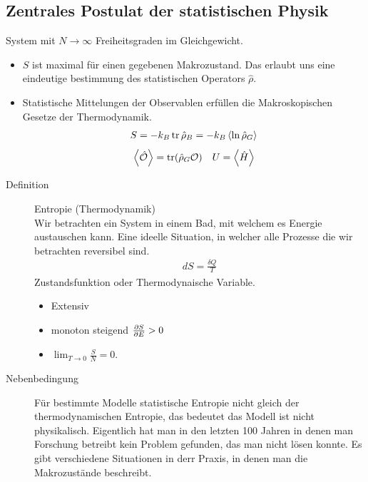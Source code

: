 \subsection*{Zentrales Postulat der statistischen Physik}
System mit $N\to \infty$ Freiheitsgraden im Gleichgewicht.
\begin{itemize}
  \item $S$ ist maximal f\"ur einen gegebenen Makrozustand. Das erlaubt uns
    eine eindeutige bestimmung des statistischen Operators $\hat{\rho}$.
  \item Statistische Mittelungen der Observablen erf\"ullen die Makroskopischen
    Gesetze der Thermodynamik.
    \begin{align*}
      S = -k_B \operatorname{tr} \hat{\rho}_B = - k_B \Braket{\ln{\hat{\rho}_G}} \\
    \end{align*}
    \begin{align*}
      \Braket{\hat{\cal{O}}}= \operatorname{tr} (\hat{\rho}_G \mathcal{O}) &&
      U = \Braket{\hat{H}}
    \end{align*}

\end{itemize}
\begin{description}
  \item[Definition] Entropie (Thermodynamik) \\
    Wir betrachten ein System in einem Bad, mit welchem es Energie austauschen
    kann. Eine ideelle Situation, in welcher alle Prozesse die wir betrachten 
    reversibel sind. 
    \begin{align*}
      dS = \frac{\delta Q}{T}
    \end{align*}
    Zustandsfunktion oder Thermodynaische Variable.
    \begin{itemize}
      \item Extensiv
      \item monoton steigend $\frac{\partial S }{\partial E} > 0$
      \item $ \lim_{T \to 0} \frac{S}{N} = 0$.
    \end{itemize}
\end{description}
\begin{description}
  \item[Nebenbedingung] F\"ur bestimmte Modelle statistische Entropie nicht
    gleich der thermodynamischen Entropie, das bedeutet das Modell ist nicht
    physikalisch. Eigentlich hat man in den letzten 100 Jahren in denen man
    Forschung betreibt kein Problem gefunden, das man nicht l\"osen konnte.
    Es gibt verschiedene Situationen in derr Praxis, in denen man die Makrozust\"ande
    beschreibt. 
\end{description}
